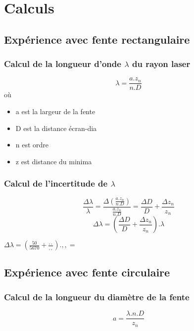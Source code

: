 \documentclass[11pt,a4paper]{report}
\begin{document}
	\section{Calculs}
		\subsection{Expérience avec fente rectangulaire}
		\subsubsection{Calcul de la longueur d'onde $\lambda$ du rayon laser}
		\begin{equation}
		\lambda = \frac{a.z_{n}}{n.D}		
		\end{equation}		 
		où
		 \begin{itemize}
		  \item a est la largeur de la fente
		  \item D est la distance écran-dia
		  \item n est ordre
		  \item z est distance du minima 
		 \end{itemize}
		
				
		\subsubsection{Calcul de l'incertitude de $\lambda$}
		\begin{equation}
		\frac{\Delta \lambda}{\lambda} = \frac{\Delta\left(\frac{a.z_{n}}{n.D}\right)}{\frac{a.z_{n}}{n.D}} 
		= \frac{\Delta D}{D}+\frac{\Delta z_{n}}{z_{n}}
		\end{equation}
		\begin{equation}
		\Delta \lambda
		= \left(\frac{\Delta D}{D}+\frac{\Delta z_{n}}{z_{n}}\right).\lambda
		\end{equation}
		\begin{center}
		$\Delta \lambda = \left(\frac{50}{5670}+\frac{,,}{,,}\right).,, = $
		\end{center}
		\subsection{Expérience avec fente circulaire}
		\subsubsection{Calcul de la longueur du diamètre de la fente}
		\begin{equation}
		a = \frac{\lambda.n.D}{z_{n}}
		\end{equation}
\end{document}
